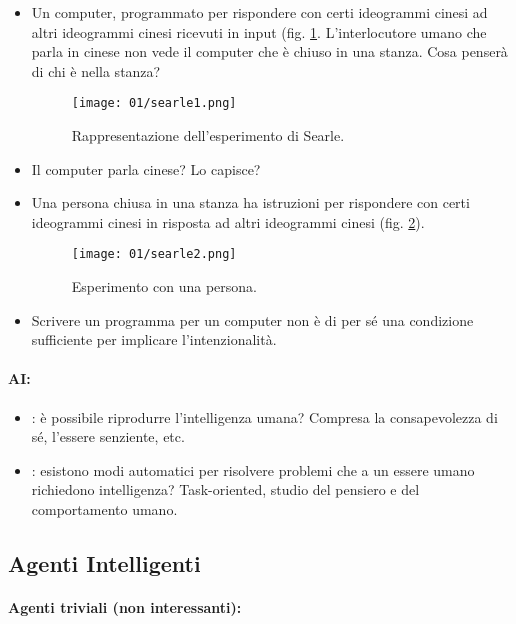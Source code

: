 \begin{itemize}
  \item Un computer, programmato per rispondere con certi ideogrammi cinesi ad altri ideogrammi cinesi ricevuti in input (fig. \ref{fig:Searle}. L'interlocutore umano che parla in cinese non vede il computer che è chiuso in una stanza. Cosa penserà di chi è nella stanza?
  \begin{figure}[h]
    \centering
    \texttt{[image: 01/searle1.png]}
    \caption{Rappresentazione dell'esperimento di Searle.}
    \label{fig:Searle}
  \end{figure}
\item Il computer parla cinese? Lo capisce? 
\item Una persona chiusa in una stanza ha istruzioni per rispondere con certi ideogrammi cinesi in risposta ad altri ideogrammi cinesi (fig. \ref{fig:Searle2}). 
    \begin{figure}[h]
    \centering
    \texttt{[image: 01/searle2.png]}
    \caption{Esperimento con una persona.}
    \label{fig:Searle2}
  \end{figure}
\item Scrivere un programma per un computer non è di per sé una condizione sufficiente per implicare l'intenzionalità.
\end{itemize}


\paragraph{AI:}

\begin{itemize}
  \item {}: è possibile riprodurre l'intelligenza umana? Compresa la consapevolezza di sé, l'essere senziente, etc. 
  \item {}: esistono modi automatici per risolvere problemi che a un essere umano richiedono intelligenza? Task-oriented, studio del pensiero e del comportamento umano.
\end{itemize}

\subsection{Agenti Intelligenti}

\paragraph{Agenti triviali (non interessanti):}

